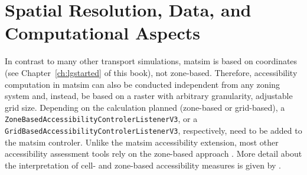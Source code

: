 

\section{Spatial Resolution, Data, and Computational Aspects}
\label{sec:spatial}
In contrast to many other transport simulations, \gls{matsim} is based on coordinates (see Chapter~\ref{ch:lgstarted} of this book),
not zone-based.
Therefore, accessibility computation in \gls{matsim} can also
be conducted independent  from any zoning system and, instead, be based on a raster with arbitrary granularity,
\ie adjustable grid size. Depending on the calculation planned (zone-based or grid-based), a 
\lstinline{ZoneBasedAccessibilityControlerListenerV3}, or a 
\lstinline{GridBasedAccessibilityControlerListenerV3}, respectively, need to be added to the \gls{matsim} controler.
%
%
Unlike the \gls{matsim} accessibility extension, most other accessibility assessment tools
rely on the zone-based approach 
\citep{CurtisEtAl2013AccessibilityPolicyInnovation, LiuZhu2004AccessibilityAnalyst, BuettnerEtAl2010Erreichbarkeitsatlas}.
%
%
More detail about the 
interpretation
of cell- and zone-based accessibility measures is given by \citet{NicolaiNagelHiResAccessibilityMethod}.
%

